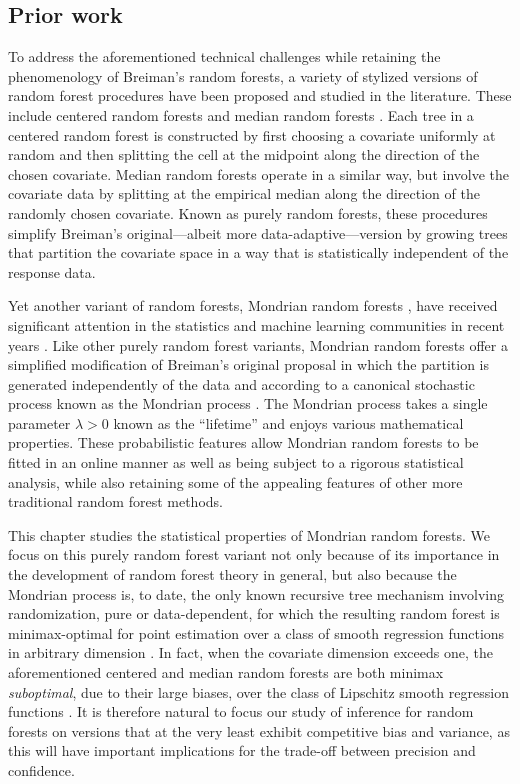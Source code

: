 \subsection{Prior work}

To address the aforementioned technical challenges while retaining the
phenomenology of Breiman's random forests, a variety of stylized versions of
random forest procedures have been proposed and studied in the literature.
These include centered random forests
\citep{biau2012analysis,arnould2023interpolation} and median random forests
\citep{duroux2018impact,arnould2023interpolation}. Each tree in a centered
random forest is constructed by first choosing a covariate uniformly at random
and then splitting the cell at the midpoint along the direction of the chosen
covariate. Median random forests operate in a similar way, but involve the
covariate data by splitting at the empirical median along the direction of the
randomly chosen covariate. Known as purely random forests, these procedures
simplify Breiman's original---albeit more data-adaptive---version by growing
trees that partition the covariate space in a way that is statistically
independent of the response data.

Yet another variant of random forests, Mondrian random forests
\citep{lakshminarayanan2014mondrian}, have received significant attention in
the statistics and machine learning communities in recent years
\citep{ma2020isolation, mourtada2020minimax, scillitoe2021uncertainty,
mourtada2021amf, vicuna2021reducing, gao2022towards, oreilly2022stochastic}.
Like
other purely random forest variants, Mondrian random forests offer a simplified
modification of Breiman's original proposal in which the partition is generated
independently of the data and according to a canonical stochastic process known
as the Mondrian process \citep{roy2008mondrian}. The Mondrian process takes a
single parameter $\lambda > 0$ known as the ``lifetime'' and enjoys various
mathematical properties. These probabilistic
features allow Mondrian random forests to be
fitted in an online manner as well as being subject to a rigorous statistical
analysis, while also retaining some of the appealing features of other
more traditional random forest methods.

This chapter studies the statistical properties of Mondrian random forests. We
focus on this purely random forest variant not only because of its importance
in the development of random forest theory in general, but also because the
Mondrian process is, to date, the only known recursive tree mechanism involving
randomization, pure or data-dependent, for which the resulting random forest is
minimax-optimal for point estimation over a class of smooth regression
functions in arbitrary dimension \citep{mourtada2020minimax}. In fact, when the
covariate dimension exceeds one, the aforementioned centered and median random
forests are both minimax \emph{suboptimal}, due to their large biases, over the
class of Lipschitz smooth regression functions \citep{klusowski2021sharp}. It
is therefore natural to focus our study of inference for random forests on
versions that at the very least exhibit competitive bias and variance, as this
will have important implications for the trade-off between precision and
confidence.

